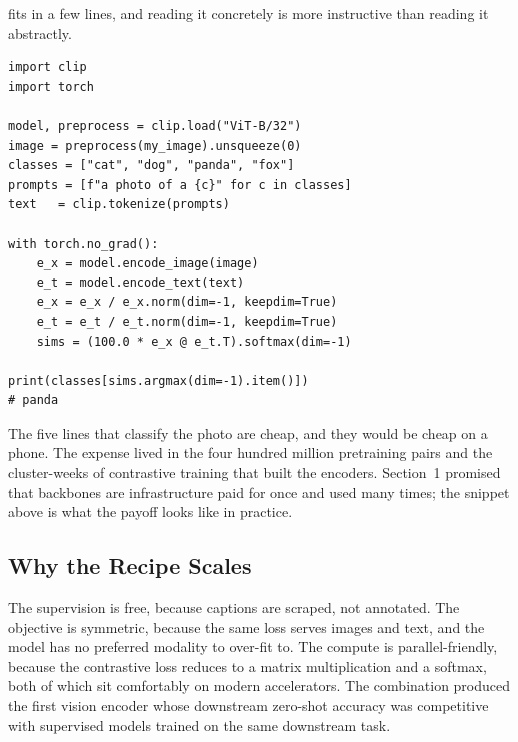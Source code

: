  fits in a few lines, and reading it concretely is more instructive than reading it abstractly.

\begin{verbatim}
import clip
import torch

model, preprocess = clip.load("ViT-B/32")
image = preprocess(my_image).unsqueeze(0)
classes = ["cat", "dog", "panda", "fox"]
prompts = [f"a photo of a {c}" for c in classes]
text   = clip.tokenize(prompts)

with torch.no_grad():
    e_x = model.encode_image(image)
    e_t = model.encode_text(text)
    e_x = e_x / e_x.norm(dim=-1, keepdim=True)
    e_t = e_t / e_t.norm(dim=-1, keepdim=True)
    sims = (100.0 * e_x @ e_t.T).softmax(dim=-1)

print(classes[sims.argmax(dim=-1).item()])
# panda
\end{verbatim}

 The five lines that classify the photo are cheap, and they would be cheap on a phone. The expense lived in the four hundred million pretraining pairs and the cluster-weeks of contrastive training that built the encoders. Section~1 promised that backbones are infrastructure paid for once and used many times; the snippet above is what the payoff looks like in practice.

\subsection{Why the Recipe Scales}

 The supervision is free, because captions are scraped, not annotated. The objective is symmetric, because the same loss serves images and text, and the model has no preferred modality to over-fit to. The compute is parallel-friendly, because the contrastive loss reduces to a matrix multiplication and a softmax, both of which sit comfortably on modern accelerators. The combination produced the first vision encoder whose downstream zero-shot accuracy was competitive with supervised models trained on the same downstream task.


